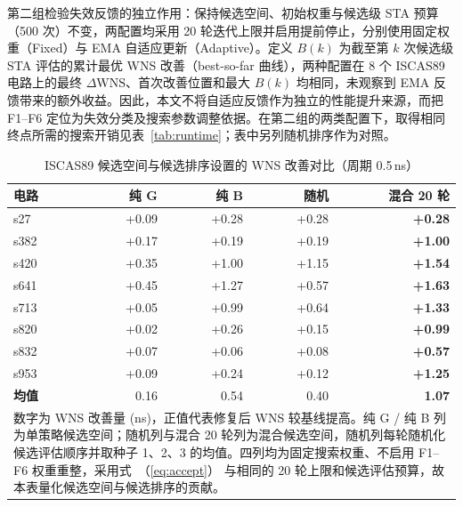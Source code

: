 \documentclass[twocolumn,10pt,fontset=windows]{ctexart}
\renewcommand{\eqref}[1]{\textup{（\ref{#1}）}}
\begin{document}
第二组检验失效反馈的独立作用：保持候选空间、初始权重与候选级 STA 预算（500 次）不变，两配置均采用 20 轮迭代上限并启用提前停止，分别使用固定权重（Fixed）与 EMA 自适应更新（Adaptive）。定义 $B(k)$ 为截至第 $k$ 次候选级 STA 评估的累计最优 WNS 改善（best-so-far 曲线），两种配置在 8 个 ISCAS89 电路上的最终 $\Delta\mathrm{WNS}$、首次改善位置和最大 $B(k)$ 均相同，未观察到 EMA 反馈带来的额外收益。因此，本文不将自适应反馈作为独立的性能提升来源，而把 F1--F6 定位为失效分类及搜索参数调整依据。在第二组的两类配置下，取得相同终点所需的搜索开销见表~\ref{tab:runtime}；表中另列随机排序作为对照。

\begin{table}[H]
\centering
\caption{ISCAS89 候选空间与候选排序设置的 WNS 改善对比（周期 0.5\,ns）}
\label{tab:ablation}
\scriptsize
\setlength{\tabcolsep}{3pt}
\begin{tabular}{lrrrr}
\toprule
\textbf{电路} & \textbf{纯 G} & \textbf{纯 B} & \textbf{随机} & \textbf{混合 20 轮} \\
\midrule
s27  & +0.09 & +0.28 & +0.28 & \textbf{+0.28} \\
s382 & +0.17 & +0.19 & +0.19 & \textbf{+1.00} \\
s420 & +0.35 & +1.00 & +1.15 & \textbf{+1.54} \\
s641 & +0.45 & +1.27 & +0.57 & \textbf{+1.63} \\
s713 & +0.05 & +0.99 & +0.64 & \textbf{+1.33} \\
s820 & +0.02 & +0.26 & +0.15 & \textbf{+0.99} \\
s832 & +0.07 & +0.06 & +0.08 & \textbf{+0.57} \\
s953 & +0.09 & +0.24 & +0.12 & \textbf{+1.25} \\
\midrule
\textbf{均值} & 0.16 & 0.54 & 0.40 & \textbf{1.07} \\
\bottomrule
\multicolumn{5}{p{0.92\columnwidth}}{\footnotesize 数字为 WNS 改善量 (ns)，正值代表修复后 WNS 较基线提高。纯 G / 纯 B 列为单策略候选空间；随机列与混合 20 轮列为混合候选空间，随机列每轮随机化候选评估顺序并取种子 1、2、3 的均值。四列均为固定搜索权重、不启用 F1--F6 权重重整，采用式~\eqref{eq:accept} 与相同的 20 轮上限和候选评估预算，故本表量化候选空间与候选排序的贡献。} \\
\end{tabular}
\end{table}
\end{document}
